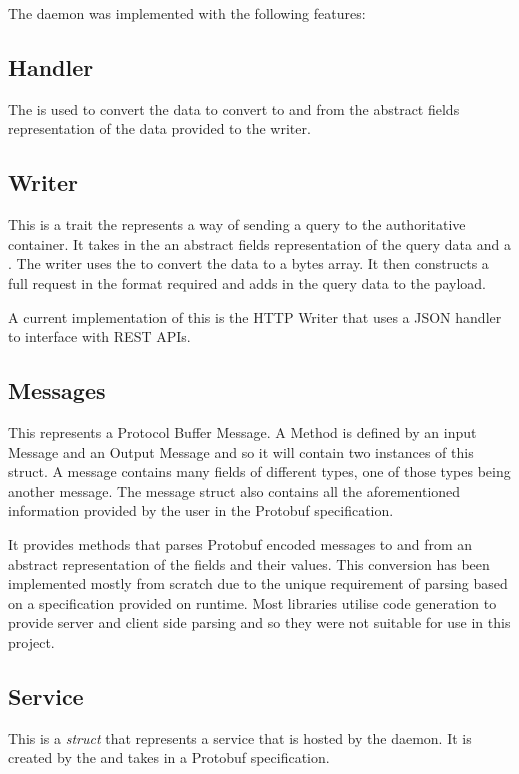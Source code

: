 \documentclass[a4paper]{article}
\begin{document}
The daemon was implemented with the following features:

\subsection{Handler}
\label{sec:handler}
The \textit{} is used to convert the data to convert to and from the abstract fields representation of the data provided to the writer.

\subsection{Writer}
\label{sec:writer}
This is a trait \cite{trait} the represents a way of sending a query to the authoritative container.
It takes in the an abstract fields representation of the query data and a \textit{}.
The writer uses the \textit{} to convert the data to a bytes array.
It then constructs a full request in the format required and adds in the query data to the payload.

A current implementation of this is the HTTP Writer that uses a JSON handler to interface with REST APIs.

\subsection{Messages}
\label{sec:messages}
This represents a Protocol Buffer Message. A Method is defined by an input Message and an Output Message and so it will contain two instances of this struct.
A message contains many fields of different types, one of those types being another message. The message struct also contains all the
aforementioned information provided by the user in the Protobuf specification.

It provides methods that parses Protobuf encoded messages to and from an abstract representation of the fields and their values. This conversion has been
implemented mostly from scratch due to the unique requirement of parsing based on a specification provided on runtime. Most libraries utilise code generation
to provide server and client side parsing and so they were not suitable for use in this project.

\subsection{Service}
\label{sec:service}
This is a \textit{struct} that represents a service that is hosted by the daemon. It is created by the \textit{} and
takes in a Protobuf specification.
\end{document}
